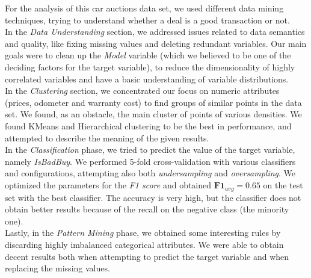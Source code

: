 \documentclass{article}
\begin{document}
	For the analysis of this car auctions data set, we used different data mining techniques, trying to understand whether a deal is a good transaction or not. \\
	In the \emph{Data Understanding} section, we addressed issues related to data semantics and quality, like fixing missing values and deleting redundant variables. Our main goals were to clean up the \emph{Model} variable (which we believed to be one of the deciding factors for the target variable), to reduce the dimensionality of highly correlated variables and have a basic understanding of variable distributions.\\
	In the \emph{Clustering} section, we concentrated our focus on numeric attributes (prices, odometer and warranty cost) to find groups of similar points in the data set. We found, as an obstacle, the main cluster of points of various densities. We found KMeans and Hierarchical clustering to be the best in performance, and attempted to describe the meaning of the given results.\\
	In the \emph{Classification} phase, we tried to predict the value of the target variable, namely \emph{IsBadBuy}. We performed 5-fold cross-validation with various classifiers and configurations, attempting also both \emph{undersampling} and \emph{oversampling}. We optimized the parameters for the \emph{F1 score} and obtained $\mathbf{F1}_{avg} = 0.65$ on the test set with the best classifier. The accuracy is very high, but the classifier does not obtain better results because of the recall on the negative class (the minority one).  \\
	Lastly, in the \emph{Pattern Mining} phase, we obtained some interesting rules by discarding highly imbalanced categorical attributes. We were able to obtain decent results both when attempting to predict the target variable and when replacing the missing values.
	
\end{document}
